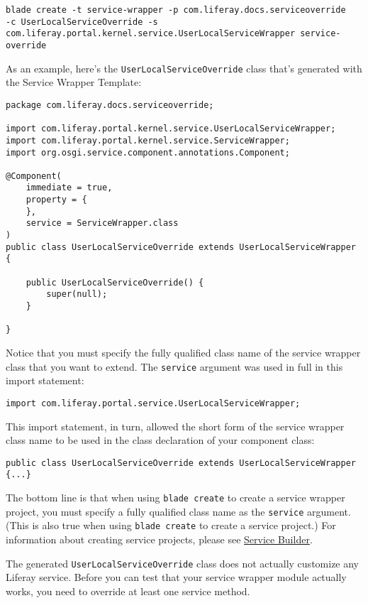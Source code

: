 \begin{verbatim}
blade create -t service-wrapper -p com.liferay.docs.serviceoverride 
-c UserLocalServiceOverride -s 
com.liferay.portal.kernel.service.UserLocalServiceWrapper service-override
\end{verbatim}

As an example, here's the \texttt{UserLocalServiceOverride} class that's
generated with the Service Wrapper Template:

\begin{verbatim}
package com.liferay.docs.serviceoverride;

import com.liferay.portal.kernel.service.UserLocalServiceWrapper;
import com.liferay.portal.kernel.service.ServiceWrapper;
import org.osgi.service.component.annotations.Component;

@Component(
    immediate = true,
    property = {
    },
    service = ServiceWrapper.class
)
public class UserLocalServiceOverride extends UserLocalServiceWrapper {

    public UserLocalServiceOverride() {
        super(null);
    }

}
\end{verbatim}

Notice that you must specify the fully qualified class name of the
service wrapper class that you want to extend. The \texttt{service}
argument was used in full in this import statement:

\begin{verbatim}
import com.liferay.portal.service.UserLocalServiceWrapper;
\end{verbatim}

This import statement, in turn, allowed the short form of the service
wrapper class name to be used in the class declaration of your component
class:

\begin{verbatim}
public class UserLocalServiceOverride extends UserLocalServiceWrapper {...}
\end{verbatim}

The bottom line is that when using \texttt{blade\ create} to create a
service wrapper project, you must specify a fully qualified class name
as the \texttt{service} argument. (This is also true when using
\texttt{blade\ create} to create a service project.) For information
about creating service projects, please see
\href{/docs/7-2/appdev/-/knowledge_base/a/service-builder}{Service
Builder}.

The generated \texttt{UserLocalServiceOverride} class does not actually
customize any Liferay service. Before you can test that your service
wrapper module actually works, you need to override at least one service
method.

